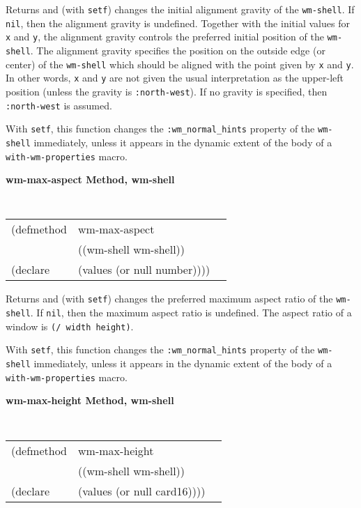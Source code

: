 \documentclass[twoside]{book}
\begin{document}
\begin{sloppy}
{\begin{flushright}
{}\end{flushright}}

\begin{flushright} \parbox[t]{6.125in}{ Returns and (with {\tt setf}) changes
the initial alignment gravity of the {\tt wm-shell}. If {\tt nil}, then the alignment gravity
is undefined. Together with the initial values for
{\tt x} and {\tt y}, the alignment gravity controls the preferred initial
position of the {\tt wm-shell}. The alignment gravity specifies the position on
the outside edge (or center) of the {\tt wm-shell} which should be aligned with
the point given by {\tt x} and {\tt y}. In other words, {\tt x} and {\tt y} are
not given the usual interpretation as the upper-left position (unless the
gravity is {\tt :north-west}). If no gravity is specified, then {\tt
:north-west} is assumed.

With {\tt setf}, this function changes the {\tt :wm\_normal\_hints} property of
the {\tt wm-shell} immediately, unless it appears in the dynamic extent of the
body of a {\tt with-wm-properties} macro.

}\end{flushright}


{\samepage
{\large {\bf wm-max-aspect \hfill Method, wm-shell}}
\begin{flushright} \parbox[t]{6.125in}{
\tt
\begin{tabular}{lll}
\raggedright
(defmethod & wm-max-aspect & \\
           & ((wm-shell  wm-shell)) \\
(declare   & (values (or null number))))
\end{tabular}
\rm

}\end{flushright}}

\begin{flushright} \parbox[t]{6.125in}{
Returns and (with {\tt setf}) changes the preferred maximum aspect ratio of the
{\tt wm-shell}. If {\tt nil}, then the maximum aspect ratio is undefined. The aspect ratio of a
window is {\tt (/ width height)}. 

With {\tt setf}, this function changes the {\tt :wm\_normal\_hints} property of
the {\tt wm-shell} immediately, unless it appears in the dynamic extent of the
body of a {\tt with-wm-properties} macro.

}\end{flushright}


{\samepage
{\large {\bf wm-max-height \hfill Method, wm-shell}}
\begin{flushright} \parbox[t]{6.125in}{
\tt
\begin{tabular}{lll}
\raggedright
(defmethod & wm-max-height & \\
           & ((wm-shell  wm-shell)) \\
(declare   & (values (or null card16))))
\end{tabular}
\rm

}
\end{flushright}}
\end{sloppy}
\end{document}
